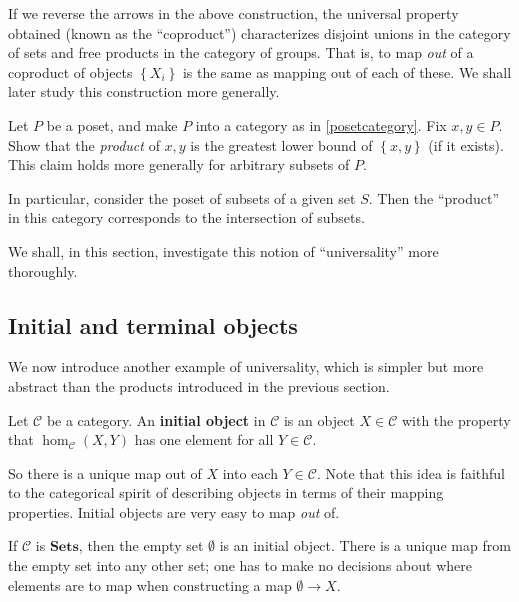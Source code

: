 \begin{remark}
 If we reverse the arrows in the above construction, 
the universal property obtained (known as the ``coproduct'') characterizes
disjoint unions in the category of sets and free products in the category of
groups.
That is, to map \emph{out} of a  coproduct of objects $\left\{X_i\right\}$ is the same as
mapping out of each of these. We shall later study this construction more
generally.
\end{remark}


\begin{exercise} 
Let $P$ be a poset, and make $P$ into a category as in \cref{posetcategory}.
Fix $x, y \in P$. Show that the \emph{product} of $x,y$ is the greatest lower 
bound of $\left\{x,y\right\}$ (if it exists). This claim holds more generally
for arbitrary subsets of $P$.

In particular, consider the poset of subsets of a given set $S$. Then the
``product'' in this category corresponds to the intersection of subsets.
\end{exercise} 

We shall, in this section, investigate this notion of ``universality''
more thoroughly.


\subsection{Initial and terminal objects}

We now introduce another example of universality, which is simpler but more
abstract than the products introduced in the previous section.

\begin{definition}
Let $\mathcal{C}$ be a category. An \textbf{initial object} in $\mathcal{C}$ is an
object $X \in \mathcal{C}$ with the property that $\hom_{\mathcal{C}}(X, Y)$ has one
element for all $Y \in \mathcal{C}$.

\end{definition}

So there is a unique map out of $X$ into each $Y \in \mathcal{C}$.
Note that this idea is faithful to the categorical spirit of describing objects
in terms of their mapping properties. Initial objects are very easy to map
\emph{out} of.


\begin{example}
If $\mathcal{C}$ is $\mathbf{Sets}$, then the empty set $\emptyset$ is an
initial object. There is a unique map from the empty set into any other set;
one has to make no decisions about where elements are to map when
constructing a map $\emptyset \to X$.
\end{example}

